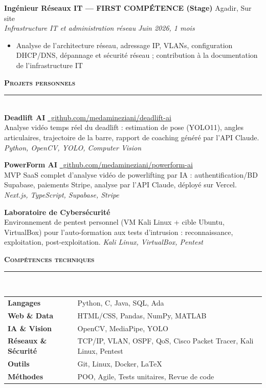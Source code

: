 \documentclass[11pt,a4paper]{article}
\newcommand{\cvsection}[1]{%
  \vspace{7pt}
  {\color{accent}\large\bfseries\scshape #1}\\[1pt]
  {\color{accent}\rule{\linewidth}{0.9pt}}\\[3pt]
}
\newcommand{\cventry}[4]{%
  \noindent\textbf{#1} \hfill {\color{graytext}\small #4}\\
  {\color{accent}\itshape #3} \hfill {\itshape\small #2}\\[2pt]
}
\begin{document}
\vspace{4pt}
\cventry{Ingénieur Réseaux IT — FIRST COMPÉTENCE (Stage)}{Juin 2026, 1 mois}{Infrastructure IT et administration réseau}{Agadir, Sur site}
\begin{itemize}
  \item Analyse de l'architecture réseau, adressage IP, VLANs, configuration DHCP/DNS, dépannage et sécurité réseau ; contribution à la documentation de l'infrastructure IT
\end{itemize}
\normalsize

\cvsection{Projets personnels}
\small
\textbf{Deadlift AI} \hfill \href{https://github.com/medamineziani/deadlift-ai}{\faGithub\ github.com/medamineziani/deadlift-ai}\\
Analyse vidéo temps réel du deadlift : estimation de pose (YOLO11), angles articulaires, trajectoire de la barre, rapport de coaching généré par l'API Claude. \textit{\color{graytext}Python, OpenCV, YOLO, Computer Vision}

\vspace{4pt}
\textbf{PowerForm AI} \hfill \href{https://github.com/medamineziani/powerform-ai}{\faGithub\ github.com/medamineziani/powerform-ai}\\
MVP SaaS complet d'analyse vidéo de powerlifting par IA : authentification/BD Supabase, paiements Stripe, analyse par l'API Claude, déployé sur Vercel. \textit{\color{graytext}Next.js, TypeScript, Supabase, Stripe}

\vspace{4pt}
\textbf{Laboratoire de Cybersécurité}\\
Environnement de pentest personnel (VM Kali Linux + cible Ubuntu, VirtualBox) pour l'auto-formation aux tests d'intrusion : reconnaissance, exploitation, post-exploitation. \textit{\color{graytext}Kali Linux, VirtualBox, Pentest}
\normalsize

\cvsection{Compétences techniques}
\small
\begin{tabularx}{\linewidth}{@{}>{\bfseries}l X@{}}
\textbf{Langages} & Python, C, Java, SQL, Ada \\[2pt]
\textbf{Web \& Data} & HTML/CSS, Pandas, NumPy, MATLAB \\[2pt]
\textbf{IA \& Vision} & OpenCV, MediaPipe, YOLO \\[2pt]
\textbf{Réseaux \& Sécurité} & TCP/IP, VLAN, OSPF, QoS, Cisco Packet Tracer, Kali Linux, Pentest \\[2pt]
\textbf{Outils} & Git, Linux, Docker, LaTeX \\[2pt]
\textbf{Méthodes} & POO, Agile, Tests unitaires, Revue de code \\
\end{tabularx}
\normalsize
\end{document}
